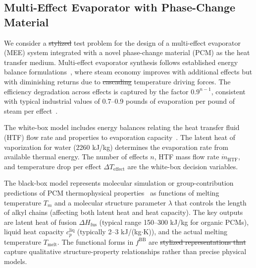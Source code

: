 \documentclass[12pt,a4paper]{article}%
\theoremstyle{plain}%
\theoremstyle{remark}%
\theoremstyle{definition}%
\def\BB{\mathrm{BB}}
\providecommand{\DIFaddtex}[1]{{\protect\color{blue}\uwave{#1}}} %
\providecommand{\DIFdeltex}[1]{{\protect\color{red}\sout{#1}}}                      %
\providecommand{\DIFaddbegin}{} %
\providecommand{\DIFaddend}{} %
\providecommand{\DIFdelbegin}{} %
\providecommand{\DIFdelend}{} %
\providecommand{\DIFadd}[1]{\texorpdfstring{\DIFaddtex{#1}}{#1}} %
\providecommand{\DIFdel}[1]{\texorpdfstring{\DIFdeltex{#1}}{}} %
\newcommand{\DIFscaledelfig}{0.5}
\newlength{\DIFdelgraphicswidth} %
\newlength{\DIFdelgraphicsheight} %
\newcommand{\DIFaddincludegraphics}[2][]{{\color{blue}\fbox{\DIFOincludegraphics[#1]{#2}}}} %
\newcommand{\DIFdelincludegraphics}[2][]{%
\sbox{\DIFdelgraphicsbox}{\DIFOincludegraphics[#1]{#2}}%
\settoboxwidth{\DIFdelgraphicswidth}{\DIFdelgraphicsbox} %
\settoboxtotalheight{\DIFdelgraphicsheight}{\DIFdelgraphicsbox} %
\scalebox{\DIFscaledelfig}{%
\parbox[b]{\DIFdelgraphicswidth}{\usebox{\DIFdelgraphicsbox}\\[-\baselineskip] \rule{\DIFdelgraphicswidth}{0em}}\llap{\resizebox{\DIFdelgraphicswidth}{\DIFdelgraphicsheight}{%
\setlength{\unitlength}{\DIFdelgraphicswidth}%
\begin{picture}(1,1)%
\thicklines\linethickness{2pt} %
{\color[rgb]{1,0,0}\put(0,0){\framebox(1,1){}}}%
{\color[rgb]{1,0,0}\put(0,0){\line( 1,1){1}}}%
{\color[rgb]{1,0,0}\put(0,1){\line(1,-1){1}}}%
\end{picture}%
}\hspace*{3pt}}} %
} %
\DeclareRobustCommand{\DIFaddbegin}{\DIFOaddbegin \let\includegraphics\DIFaddincludegraphics} %
\DeclareRobustCommand{\DIFaddend}{\DIFOaddend \let\includegraphics\DIFOincludegraphics} %
\DeclareRobustCommand{\DIFdelbegin}{\DIFOdelbegin \let\includegraphics\DIFdelincludegraphics} %
\DeclareRobustCommand{\DIFdelend}{\DIFOaddend \let\includegraphics\DIFOincludegraphics} %
\begin{document}
\begin{appendices}
\subsection{Multi-Effect Evaporator with Phase-Change Material}\label{subsec:app_evaporator}

We consider a \DIFdelbegin \DIFdel{stylized }\DIFdelend \DIFaddbegin \DIFadd{prototype }\DIFaddend test problem for the design of a multi-effect evaporator (MEE) system integrated with a novel phase-change material (PCM) as the heat transfer medium. Multi-effect evaporator synthesis follows established energy balance formulations~\cite{hillenbrand1988synthesis}, where steam economy improves with additional effects but with diminishing returns due to \DIFdelbegin \DIFdel{cascading }\DIFdelend \DIFaddbegin \DIFadd{tighter }\DIFaddend temperature driving forces. The efficiency degradation across effects is captured by the factor $0.9^{n-1}$, consistent with typical industrial values of 0.7--0.9 pounds of evaporation per pound of steam per effect~\cite{swenson2024mee}.

The white-box model includes energy balances relating the heat transfer fluid (HTF) flow rate and properties to evaporation capacity~\cite{ahmetovic2018simultaneous}. The latent heat of vaporization for water (2260 kJ/kg) determines the evaporation rate from available thermal energy. The number of effects $n$, HTF mass flow rate $\dot{m}_{\text{HTF}}$, and temperature drop per effect $\Delta T_{\text{effect}}$ are the white-box decision variables.

The black-box model represents molecular simulation or group-contribution predictions of PCM thermophysical properties~\cite{sharma2009review,zalba2003review} as functions of melting temperature $T_m$ and a molecular structure parameter $\lambda$ that controls the length of alkyl chains (affecting both latent heat and heat capacity). The key outputs are latent heat of fusion $\Delta H_{\text{fus}}$ (typical range 150--300 kJ/kg for organic PCMs), liquid heat capacity $c_p^{\text{liq}}$ (typically 2--3 kJ/(kg$\cdot$K)), and the actual melting temperature $T_{\text{melt}}$. The functional forms in $f^\BB$ are \DIFdelbegin \DIFdel{stylized representations that }\DIFdelend \DIFaddbegin \DIFadd{intended to }\DIFaddend capture qualitative structure-property relationships rather than precise physical models.


\end{appendices}
\end{document}
